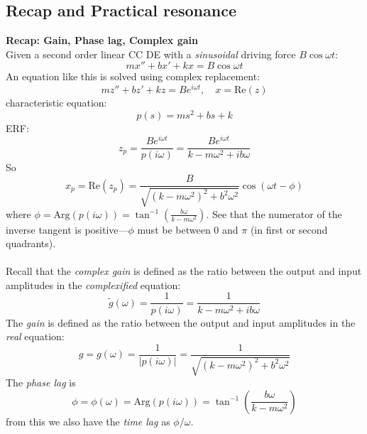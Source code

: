 \documentclass{report}
\begin{document}
\subsection{Recap and Practical resonance}
\textbf{Recap: Gain, Phase lag, Complex gain}\\
Given a second order linear CC DE with a \textit{sinusoidal} driving force $B\cos\omega t$:
\begin{equation*}
mx''+bx'+kx=B\cos\omega t
\end{equation*}
An equation like this is solved using complex replacement:
\begin{equation*}
mz''+bz'+kz=Be^{i\omega t},\quad x=\text{Re}(z)
\end{equation*}
characteristic equation:
\begin{equation*}
p(s)=ms^2+bs+k
\end{equation*}
ERF:
\begin{equation*}
z_p=\frac{Be^{i\omega t}}{p(i\omega)}=\frac{Be^{i\omega t}}{k-m\omega^2+ib\omega}
\end{equation*}
So
\begin{equation*}
x_p=\text{Re}(z_p)=\frac{B}{\sqrt{(k-m\omega^2)^2+b^2\omega^2}}\cos(\omega t-\phi)
\end{equation*}
where $\phi=\text{Arg}(p(i\omega))=\tan^{-1}\left(\frac{b\omega}{k-m\omega^2}\right)$. See that the numerator of
the inverse tangent is positive---$\phi$ must be between 0 and $\pi$ (in first or second quadrants).\\
\vspace{1mm}\\
Recall that the \textit{complex gain} is defined as the ratio between the output and input amplitudes in the 
\textit{complexified} equation:
\begin{equation*}
\tilde{g}(\omega)=\frac{1}{p(i\omega)}=\frac{1}{k-m\omega^2+ib\omega}
\end{equation*}
The \textit{gain} is defined as the ratio between the output and input amplitudes in the \textit{real} equation:
\begin{equation*}
g=g(\omega)=\frac{1}{|p(i\omega)|}=\frac{1}{\sqrt{(k-m\omega^2)^2+b^2\omega^2}}
\end{equation*}
The \textit{phase lag} is
\begin{equation*}
\phi=\phi(\omega)=\text{Arg}(p(i\omega))=\tan^{-1}\left(\frac{b\omega}{k-m\omega^2}\right)
\end{equation*}
from this we also have the \textit{time lag} as $\phi/\omega$.\\
\end{document}
